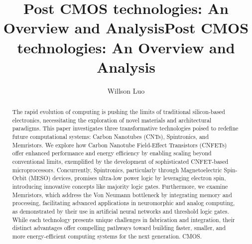 \documentclass[sigconf]{acmart}
\title{Post CMOS technologies: An Overview and Analysis}
\begin{document}
\title{Post CMOS technologies: An Overview and Analysis}

\author{Willson Luo}

\begin{abstract}
  The rapid evolution of computing is pushing the limits of traditional 
  silicon-based electronics, necessitating the exploration of 
  novel materials and architectural paradigms. This paper 
  investigates three transformative technologies poised to 
  redefine future computational systems: Carbon Nanotubes 
  (CNTs), Spintronics, and Memristors. We explore how Carbon 
  Nanotube Field-Effect Transistors (CNFETs) offer enhanced 
  performance and energy efficiency by enabling scaling beyond 
  conventional limits, exemplified by the development of 
  sophisticated CNFET-based microprocessors. Concurrently, 
  Spintronics, particularly through Magnetoelectric Spin-Orbit 
  (MESO) devices, promises ultra-low power logic by leveraging 
  electron spin, introducing innovative concepts like majority 
  logic gates. Furthermore, we examine Memristors, which address 
  the Von Neumann bottleneck by integrating memory and processing, 
  facilitating advanced applications in neuromorphic and analog 
  computing, as demonstrated by their use in artificial neural 
  networks and threshold logic gates. While each technology 
  presents unique challenges in fabrication and integration, 
  their distinct advantages offer compelling pathways toward 
  building faster, smaller, and more energy-efficient computing 
  systems for the next generation.
  CMOS.
\end{abstract}
\end{document}
